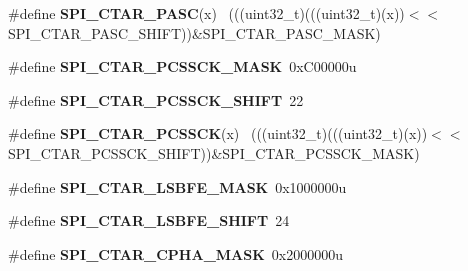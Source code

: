 \begin{DoxyCompactItemize}
\item 
\hypertarget{group___s_p_i___register___masks_ga5d50f3bff4f3b953457acd24cad45a43}{}\#define {\bfseries S\+P\+I\+\_\+\+C\+T\+A\+R\+\_\+\+P\+A\+S\+C}(x)                                              ~(((uint32\+\_\+t)(((uint32\+\_\+t)(x))$<$$<$S\+P\+I\+\_\+\+C\+T\+A\+R\+\_\+\+P\+A\+S\+C\+\_\+\+S\+H\+I\+F\+T))\&S\+P\+I\+\_\+\+C\+T\+A\+R\+\_\+\+P\+A\+S\+C\+\_\+\+M\+A\+S\+K)\label{group___s_p_i___register___masks_ga5d50f3bff4f3b953457acd24cad45a43}

\item 
\hypertarget{group___s_p_i___register___masks_ga27ec6f89727e91f1d272d06c6f1c44b3}{}\#define {\bfseries S\+P\+I\+\_\+\+C\+T\+A\+R\+\_\+\+P\+C\+S\+S\+C\+K\+\_\+\+M\+A\+S\+K}~0x\+C00000u\label{group___s_p_i___register___masks_ga27ec6f89727e91f1d272d06c6f1c44b3}

\item 
\hypertarget{group___s_p_i___register___masks_ga8bb5e598d3bbadd3efc273c57bc522ab}{}\#define {\bfseries S\+P\+I\+\_\+\+C\+T\+A\+R\+\_\+\+P\+C\+S\+S\+C\+K\+\_\+\+S\+H\+I\+F\+T}~22\label{group___s_p_i___register___masks_ga8bb5e598d3bbadd3efc273c57bc522ab}

\item 
\hypertarget{group___s_p_i___register___masks_ga758b6b07db9746754a43ab38b28c519a}{}\#define {\bfseries S\+P\+I\+\_\+\+C\+T\+A\+R\+\_\+\+P\+C\+S\+S\+C\+K}(x)                                          ~(((uint32\+\_\+t)(((uint32\+\_\+t)(x))$<$$<$S\+P\+I\+\_\+\+C\+T\+A\+R\+\_\+\+P\+C\+S\+S\+C\+K\+\_\+\+S\+H\+I\+F\+T))\&S\+P\+I\+\_\+\+C\+T\+A\+R\+\_\+\+P\+C\+S\+S\+C\+K\+\_\+\+M\+A\+S\+K)\label{group___s_p_i___register___masks_ga758b6b07db9746754a43ab38b28c519a}

\item 
\hypertarget{group___s_p_i___register___masks_gadefae41f4962681a83ae61a653026dc2}{}\#define {\bfseries S\+P\+I\+\_\+\+C\+T\+A\+R\+\_\+\+L\+S\+B\+F\+E\+\_\+\+M\+A\+S\+K}~0x1000000u\label{group___s_p_i___register___masks_gadefae41f4962681a83ae61a653026dc2}

\item 
\hypertarget{group___s_p_i___register___masks_ga5f3c8977a22e59cab407497ba5e32dc9}{}\#define {\bfseries S\+P\+I\+\_\+\+C\+T\+A\+R\+\_\+\+L\+S\+B\+F\+E\+\_\+\+S\+H\+I\+F\+T}~24\label{group___s_p_i___register___masks_ga5f3c8977a22e59cab407497ba5e32dc9}

\item 
\hypertarget{group___s_p_i___register___masks_ga562416b33f74ea5595e122d862093e51}{}\#define {\bfseries S\+P\+I\+\_\+\+C\+T\+A\+R\+\_\+\+C\+P\+H\+A\+\_\+\+M\+A\+S\+K}~0x2000000u\label{group___s_p_i___register___masks_ga562416b33f74ea5595e122d862093e51}


\end{DoxyCompactItemize}
